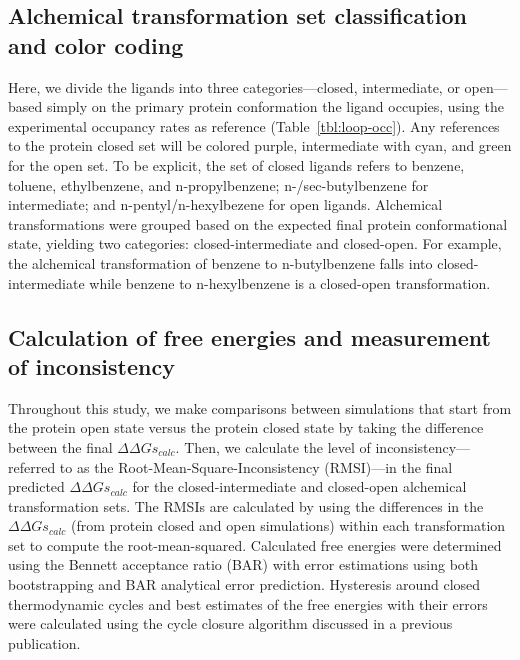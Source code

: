 \documentclass[journal=jctcce,manuscript=article]{achemso}
\begin{document}
\subsection*{Alchemical transformation set classification and color coding}
Here, we divide the ligands into three categories---closed, intermediate, or open---based simply on the primary protein conformation the ligand occupies, using the experimental occupancy rates as reference (Table~\ref{tbl:loop-occ}).
Any references to the protein closed set will be colored purple, intermediate with cyan, and green for the open set.
To be explicit, the set of closed ligands refers to benzene, toluene, ethylbenzene, and n-propylbenzene; n-/sec-butylbenzene for intermediate; and n-pentyl/n-hexylbezene for open ligands.
Alchemical transformations were grouped based on the expected final protein conformational state, yielding two categories: closed-intermediate and closed-open.
For example, the alchemical transformation of benzene to n-butylbenzene falls into closed-intermediate while benzene to n-hexylbenzene is a closed-open transformation. 

\subsection*{Calculation of free energies and measurement of inconsistency}
Throughout this study, we make comparisons between simulations that start from the protein open state versus the protein closed state by taking the difference between the final $\Delta\Delta Gs_{calc}$.
Then, we calculate the level of inconsistency---referred to as the Root-Mean-Square-Inconsistency (RMSI)\footnotemark---in the final predicted $\Delta\Delta Gs_{calc}$ for the closed-intermediate and closed-open alchemical transformation sets. 
The RMSIs are calculated by using the differences in the $\Delta\Delta Gs_{calc}$ (from protein closed and open simulations) within each transformation set to compute the root-mean-squared.
Calculated free energies were determined using the Bennett acceptance ratio\cite{BAR} (BAR) with error estimations using both bootstrapping and BAR analytical error prediction\cite{BARerror}.
Hysteresis around closed thermodynamic cycles and best estimates of the free energies with their errors were calculated using the cycle closure algorithm discussed in a previous publication\cite{FEP/REST}.
\end{document}
